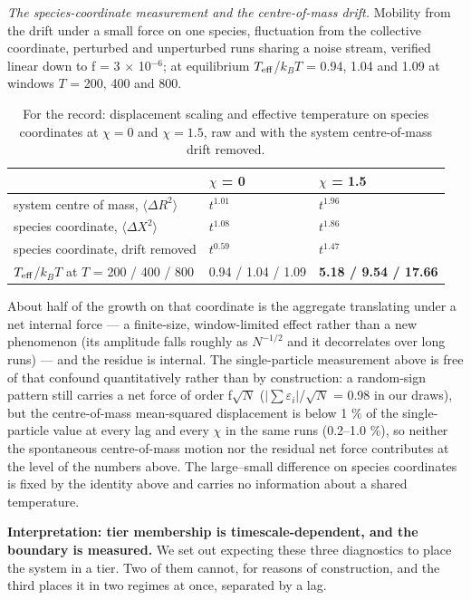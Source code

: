 \documentclass[aps,pre,preprint,superscriptaddress,nofootinbib,longbibliography]{revtex4-2}
\begin{document}
\emph{The species-coordinate measurement and the centre-of-mass drift.} Mobility from the drift under a small force on one species, fluctuation from the collective coordinate, perturbed and unperturbed runs sharing a noise stream, verified linear down to f = 3 $\times$ 10$^{-6}$; at equilibrium $T_{\rm eff}$/$k_BT$ = 0.94, 1.04 and 1.09 at windows $T$ = 200, 400 and 800.

\begin{table}[htbp]
\caption{For the record: displacement scaling and effective temperature on species coordinates at $\chi=0$ and $\chi=1.5$, raw and with the system centre-of-mass drift removed.}
\label{tab:17}
\begin{ruledtabular}
\begin{tabular}{p{6.07cm}p{3.64cm}p{4.54cm}}
\raggedright
 & $\chi$ = 0 & $\chi$ = 1.5 \\
\hline
system centre of mass, $\langle \Delta R^2\rangle$ & $t^{1.01}$ & \textbf{$t^{1.96}$} \\
species coordinate, $\langle \Delta X^2\rangle$ & $t^{1.08}$ & $t^{1.86}$ \\
species coordinate, drift removed & $t^{0.59}$ & $t^{1.47}$ \\
$T_{\rm eff}$/$k_BT$ at $T$ = 200 / 400 / 800 & 0.94 / 1.04 / 1.09 & \textbf{5.18 / 9.54 / 17.66} \\
\end{tabular}
\end{ruledtabular}
\end{table}

About half of the growth on that coordinate is the aggregate translating under a net internal force --- a finite-size, window-limited effect rather than a new phenomenon (its amplitude falls roughly as $N^{-1/2}$ and it decorrelates over long runs) --- and the residue is internal. The single-particle measurement above is free of that confound quantitatively rather than by construction: a random-sign pattern still carries a net force of order f$\sqrt{N}$ ($| \sum$$\varepsilon_{i}$$|$/$\sqrt{N}$ = 0.98 in our draws), but the centre-of-mass mean-squared displacement is below 1 \% of the single-particle value at every lag and every $\chi$ in the same runs (0.2--1.0 \%), so neither the spontaneous centre-of-mass motion nor the residual net force contributes at the level of the numbers above. The large--small difference on species coordinates is fixed by the identity above and carries no information about a shared temperature.

\textbf{Interpretation: tier membership is timescale-dependent, and the boundary is measured.} We set out expecting these three diagnostics to place the system in a tier. Two of them cannot, for reasons of construction, and the third places it in two regimes at once, separated by a lag.
\end{document}
